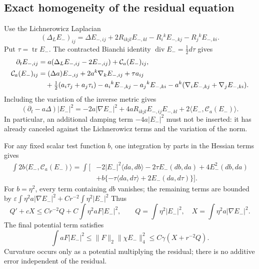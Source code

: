 \documentclass[a4paper,11pt]{article}
\numberwithin{equation}{section}
\theoremstyle{definition}
\newcommand{\tr}{\operatorname{tr}}
\begin{document}
\subsection{Exact homogeneity of the residual equation}
Use the Lichnerowicz Laplacian
\[
(\Delta_LE_-)_{ij}=\Delta E_{-,ij}
+2R_{ikjl}E_{-,kl}-R_i{}^kE_{-,kj}-R_j{}^kE_{-,ki}.
\]
Put $\tau=\tr E_-$. The contracted Bianchi identity $\operatorname{div}E_-=\tfrac12d\tau$ gives
\begin{align}
\partial_tE_{-,ij}&=a(\Delta_LE_{-,ij}-2E_{-,ij})+\mathcal C_a(E_-)_{ij},\\
\mathcal C_a(E_-)_{ij}
&=(\Delta a)E_{-,ij}+2a^k\nabla_kE_{-,ij}+\tau a_{ij}\notag\\
&\quad+\tfrac12(a_i\tau_j+a_j\tau_i)
-a_i{}^kE_{-,kj}-a_j{}^kE_{-,ki}
-a^k(\nabla_iE_{-,kj}+\nabla_jE_{-,ki}).\notag
\end{align}
Including the variation of the inverse metric gives
\begin{equation}\label{eq:Enorm}
(\partial_t-a\Delta)|E_-|^2
=-2a|\nabla E_-|^2+4aR_{ikjl}E_{-,ij}E_{-,kl}
+2\langle E_-,\mathcal C_a(E_-)\rangle .
\end{equation}
In particular, an additional damping term $-4a|E_-|^2$ must not be inserted: it has already canceled against the Lichnerowicz terms and the variation of the norm.

For any fixed scalar test function $b$, one integration by parts in the Hessian terms gives
\begin{align*}
\int2b\langle E_-,\mathcal C_a(E_-)\rangle
=\int\bigl[&
-2|E_-|^2\langle da,db\rangle
-2\tau E_-(db,da)+4E_-^2(db,da)\\
&+b\{-\tau\langle da,d\tau\rangle+2E_-(da,d\tau)\}\bigr].
\end{align*}
For $b=\eta^2$, every term containing $db$ vanishes; the remaining terms are bounded by
$\varepsilon\int\eta^2a|\nabla E_-|^2+Cr^{-2}\int\eta^2|E_-|^2$
Thus
\begin{equation}\label{eq:Qenergy}
Q'+cX\le Cr^{-2}Q+C\int\eta^2aF|E_-|^2,\qquad
Q=\int\eta^2|E_-|^2,\quad X=\int\eta^2a|\nabla E_-|^2.
\end{equation}
The final potential term satisfies
\[
\int aF|E_-|^2
\le\|F\|_2\|\chi E_-\|_4^2
\le C\gamma(X+r^{-2}Q).
\]
Curvature occurs only as a potential multiplying the residual; there is no additive error independent of the residual.
\end{document}
